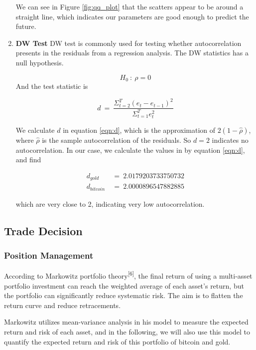 \documentclass[12pt,a4paper]{article}
\begin{document}
\begin{spacing}{1.2}
\begin{enumerate}
	We can see in Figure \ref{fig:qq_plot} that the scatters appear to be around a straight line, which indicates our parameters are good enough to predict the future.
	
	\item \textbf{DW Test}
	DW test is commonly used for testing whether autocorrelation presents in the residuals from a regression analysis. The DW statistics has a null hypothesis.
	
$$
	H_0 \ : \ \rho = 0	
$$
	And the test statistic is
	
	\begin{equation}\label{eqn:d}
		d \ = \ \frac{\Sigma_{t=2}^T(e_t-e_{t-1})^2}{\Sigma_{t=1}^T e_t^2}
	\end{equation}

	We calculate $d$ in equation \ref{eqn:d}, which is the approximation of $2(1-\hat{\rho})$, where $\hat{\rho}$ is the sample autocorrelation of the residuals. So $d=2$ indicates no autocorrelation. In our case, we calculate the values in by equation \ref{eqn:d}, and find
	
\begin{align*}
	d_{gold} \ &= \ 2.0179203733750732 \\
	d_{bitcoin} \ &= \ 2.0000896547882885
\end{align*}

	which are very close to 2, indicating very low autocorrelation. 
\end{enumerate}

\subsection{Trade Decision}

\subsubsection{Position Management}
\label{sec:pos_management}

According to Markowitz portfolio theory\textsuperscript{[6]}, the final return of using a multi-asset portfolio investment can reach the weighted average of each asset's return, but the portfolio can significantly reduce systematic risk. The aim is to flatten the return curve and reduce retracements.

Markowitz utilizes mean-variance analysis in his model to measure the expected return and risk of each asset, and in the following, we will also use this model to quantify the expected return and risk of this portfolio of bitcoin and gold.


\end{spacing}
\end{document}

